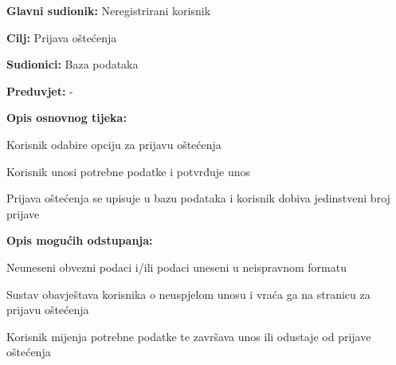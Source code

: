 \noindent {}
\begin{packed_item}

	\item \textbf{Glavni sudionik: }Neregistrirani korisnik
	\item  \textbf{Cilj:} Prijava oštećenja
	\item  \textbf{Sudionici:} Baza podataka
	\item  \textbf{Preduvjet:} -
	\item  \textbf{Opis osnovnog tijeka:}

	\item[] \begin{packed_enum}

		\item Korisnik odabire opciju za prijavu oštećenja
		\item Korisnik unosi potrebne podatke i potvrđuje unos
		\item Prijava oštećenja se upisuje u bazu podataka i korisnik dobiva jedinstveni broj prijave
	\end{packed_enum}

	\item  \textbf{Opis mogućih odstupanja:}

	\item[] \begin{packed_item}

		\item[2.a] Neuneseni obvezni podaci i/ili podaci uneseni u neispravnom formatu 
		\item[] \begin{packed_enum}

			\item Sustav obavještava korisnika o neuspjelom unosu i vraća ga na stranicu za prijavu oštećenja
			\item Korisnik mijenja potrebne podatke te završava unos ili odustaje od prijave oštećenja

		\end{packed_enum}
	\end{packed_item}
\end{packed_item}


